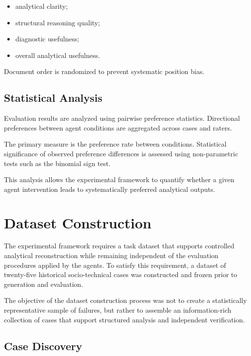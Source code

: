 \begin{itemize}

\item analytical clarity;

\item structural reasoning quality;

\item diagnostic usefulness;

\item overall analytical usefulness.

\end{itemize}

Document order is randomized to prevent systematic position bias.

\subsection{Statistical Analysis}

Evaluation results are analyzed using pairwise preference statistics.
Directional preferences between agent conditions are aggregated across
cases and raters.

The primary measure is the preference rate between conditions. Statistical
significance of observed preference differences is assessed using
non-parametric tests such as the binomial sign test.

This analysis allows the experimental framework to quantify whether a given
agent intervention leads to systematically preferred analytical outputs.
\section{Dataset Construction}

The experimental framework requires a task dataset that supports controlled
analytical reconstruction while remaining independent of the evaluation
procedures applied by the agents. To satisfy this requirement, a dataset of
twenty-five historical socio-technical cases was constructed and frozen
prior to generation and evaluation.

The objective of the dataset construction process was not to create a
statistically representative sample of failures, but rather to assemble an
information-rich collection of cases that support structured analysis and
independent verification.

\subsection{Case Discovery}

